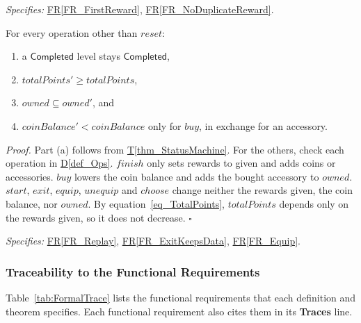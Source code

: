 \documentclass[12pt]{article}
\newcommand{\rref}[1]{\hyperref[#1]{FR\ref*{#1}}}
\newcounter{thmnum} %
\newcommand{\thmref}[1]{\hyperref[#1]{T\ref*{#1}}}
\newenvironment{theorem}[2]{%
  \refstepcounter{thmnum}\label{#2}%
  \tcolorbox[formalbox, colback=teal!7, colframe=teal!80!black,
    title={Theorem T\thethmnum: #1}]%
}{\endtcolorbox}
\newcommand{\defref}[1]{\hyperref[#1]{D\ref*{#1}}}
\newcommand{\val}[1]{\ensuremath{\mathsf{#1}}}
\begin{document}
\textit{Specifies:} \rref{FR_FirstReward}, \rref{FR_NoDuplicateReward}.

\begin{theorem}{Progress is lost only by a reset}{thm_NoLoss}
For every operation other than $\mathit{reset}$:
\begin{enumerate}
\item[(a)] a \val{Completed} level stays \val{Completed},
\item[(b)] $\mathit{totalPoints}' \geq \mathit{totalPoints}$,
\item[(c)] $\mathit{owned} \subseteq \mathit{owned}'$, and
\item[(d)] $\mathit{coinBalance}' < \mathit{coinBalance}$ only for
  $\mathit{buy}$, in exchange for an accessory.
\end{enumerate}
\end{theorem}
\textit{Proof.} Part (a) follows from \thmref{thm_StatusMachine}. For the
others, check each operation in \defref{def_Ops}. $\mathit{finish}$ only sets
rewards to given and adds coins or accessories. $\mathit{buy}$ lowers the coin
balance and adds the bought accessory to $\mathit{owned}$. $\mathit{start}$,
$\mathit{exit}$, $\mathit{equip}$, $\mathit{unequip}$ and $\mathit{choose}$
change neither the rewards given, the coin balance, nor $\mathit{owned}$. By
equation~\eqref{eq_TotalPoints}, $\mathit{totalPoints}$ depends only on the
rewards given, so it does not decrease. \hfill $\square$

\textit{Specifies:} \rref{FR_Replay}, \rref{FR_ExitKeepsData},
\rref{FR_Equip}.

\subsubsection{Traceability to the Functional Requirements}
\label{sec_FormalTrace}

Table~\ref{tab:FormalTrace} lists the functional requirements that each
definition and theorem specifies. Each functional requirement also cites them
in its \textbf{Traces} line.
\end{document}
